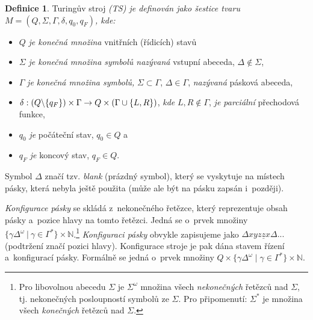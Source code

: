 \documentclass[a4paper,11pt,twocolumn]{article}
\theoremstyle{definition}
\newtheorem{definice}{Definice}
\theoremstyle{definition}
\theoremstyle{definition}
\begin{document}
\begin{definice}
\label{definice1} Turingův stroj \emph{(TS) je definován jako šestice tvaru $M=(Q,\Sigma,\Gamma,\delta, q_{0}, q_{F})$, kde:}
\begin{itemize}

  \item $Q$ \emph{je konečná množina} vnitřních (řídicích) stavů

  \item $\Sigma$ \emph{je konečná množina symbolů nazývaná} vstupní abeceda, $\Delta \notin \Sigma$,

  \item $\Gamma$ \emph{je konečná množina symbolů,} $\Sigma \subset \Gamma$, $\Delta \in \Gamma$, \emph{nazývaná} pásková abeceda,

  \item $\delta : (Q \symbol{92} \{q_{F}\})\times\Gamma \rightarrow Q \times (\Gamma \cup \{ L,R \} )$, \emph{kde} $L,R \notin \Gamma$, \emph{je parciální} přechodová funkce,

  \item $q_{0}$ \emph{je} počáteční stav, $q_{0} \in Q$ a

  \item $q_{F}$ \emph{je} koncový stav, $q_{F} \in Q$.

\end{itemize}
\par
Symbol $\Delta$ značí tzv. \emph{blank} (prázdný symbol), který se vyskytuje na místech pásky, která nebyla ještě použita (může ale být na pásku zapsán i~později).\par
\emph{Konfigurace pásky} se skládá z~nekonečného řetězce, který reprezentuje obsah pásky a~pozice hlavy na tomto řetězci. Jedná se o~prvek množiny $\{ \gamma \Delta^{\omega}~|~\gamma \in \Gamma^{*} \} \times \mathbb{N}$.\footnote{Pro libovolnou abecedu $\Sigma$ je $\Sigma^{\omega}$ množina všech \emph{nekonečných} řetězců nad $\Sigma$, tj. nekonečných posloupností symbolů ze $\Sigma$. Pro připomenutí: $\Sigma^{*}$ je množina všech \emph{konečných} řetězců nad $\Sigma$.}
\linebreak \emph{Konfiguraci pásky} obvykle zapisujeme jako $\Delta xyz\underline{z}x\Delta ... $ (podtržení značí pozici hlavy). Konfigurace stroje je pak dána stavem řízení a~konfigurací pásky. Formálně se jedná o~prvek množiny $Q  \times \{ \gamma \Delta^{\omega} \mid \gamma \in \Gamma^{*} \} \times \mathbb{N} $.

\end{definice}
\end{document}
